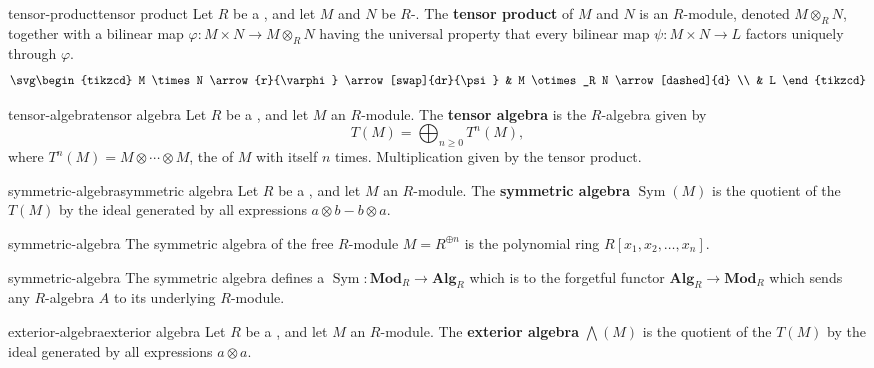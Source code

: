 \begin{topic}{tensor-product}{tensor product}
    Let $R$ be a , and let $M$ and $N$ be $R$-. The \textbf{tensor product} of $M$ and $N$ is an $R$-module, denoted $M \otimes_R N$, together with a bilinear map $\varphi : M \times N \to M \otimes_R N$ having the universal property that every bilinear map $\psi : M \times N \to L$ factors uniquely through $\varphi$.
    \[ \svg \begin{tikzcd} M \times N \arrow{r}{\varphi} \arrow[swap]{dr}{\psi} & M \otimes_R N \arrow[dashed]{d} \\ & L \end{tikzcd} \]
\end{topic}

\begin{topic}{tensor-algebra}{tensor algebra}
    Let $R$ be a , and let $M$ an $R$-module. The \textbf{tensor algebra} is the $R$-algebra given by
    \[ T(M) = \bigoplus_{n \ge 0} T^n(M) , \]
    where $T^n(M) = M \otimes \cdots \otimes M$, the  of $M$ with itself $n$ times. Multiplication given by the tensor product.
\end{topic}

\begin{topic}{symmetric-algebra}{symmetric algebra}
    Let $R$ be a , and let $M$ an $R$-module. The \textbf{symmetric algebra} $\operatorname{Sym}(M)$ is the quotient of the  $T(M)$ by the ideal generated by all expressions $a \otimes b - b \otimes a$.
\end{topic}

\begin{example}{symmetric-algebra}
    The symmetric algebra of the free $R$-module $M = R^{\oplus n}$ is the polynomial ring $R[x_1, x_2, \ldots, x_n]$.
\end{example}

\begin{example}{symmetric-algebra}
    The symmetric algebra defines a  $\operatorname{Sym} : \textbf{Mod}_R \to \textbf{Alg}_R$ which is  to the forgetful functor $\textbf{Alg}_R \to \textbf{Mod}_R$ which sends any $R$-algebra $A$ to its underlying $R$-module.
\end{example}

\begin{topic}{exterior-algebra}{exterior algebra}
    Let $R$ be a , and let $M$ an $R$-module. The \textbf{exterior algebra} $\bigwedge(M)$ is the quotient of the  $T(M)$ by the ideal generated by all expressions $a \otimes a$.
\end{topic}
